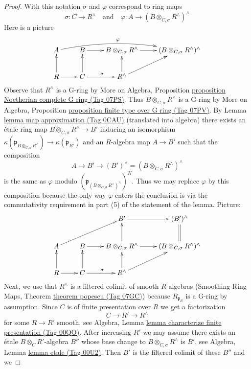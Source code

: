 \documentclass{amsart}
\theoremstyle{plain}
\theoremstyle{definition}
\theoremstyle{remark}
\numberwithin{equation}{subsection}
\begin{document}
\begin{proof}
\medskip\noindent
With this notation $\sigma$ and $\varphi$ correspond to ring maps
$$
\sigma : C \to R^\wedge
\quad\text{and}\quad
\varphi : A \longrightarrow (B \otimes_{C, \sigma} R^\wedge)^\wedge
$$
Here is a picture
$$
\xymatrix{
A \ar@/^1em/[rrr]^\varphi &
B \ar[r] &
B \otimes_{C, \sigma} R^\wedge \ar[r] &
(B \otimes_{C, \sigma} R^\wedge)^\wedge \\
R \ar[r] \ar[u] &
C \ar[r]^\sigma \ar[u] & R^\wedge \ar[u] \ar[ru]
}
$$
Observe that $R^\wedge$ is a G-ring by
More on Algebra, Proposition
\href{https://stacks.math.columbia.edu/tag/07PS}{proposition Noetherian complete G ring (Tag 07PS)}.
Thus $B \otimes_{C, \sigma} R^\wedge$ is a G-ring by
More on Algebra, Proposition
\href{https://stacks.math.columbia.edu/tag/07PV}{proposition finite type over G ring (Tag 07PV)}.
By Lemma \href{https://stacks.math.columbia.edu/tag/0CAU}{lemma map approximation (Tag 0CAU)} (translated into algebra)
there exists an \'etale ring map $B \otimes_{C, \sigma} R^\wedge \to B'$
inducing an isomorphism
$\kappa(\mathfrak p_{B \otimes_{C, \sigma} R^\wedge})
\to \kappa(\mathfrak p_{B'})$
and an $R$-algebra map $A \to B'$ such that the composition
$$
A \to B' \to (B')^\wedge = (B \otimes_{C, \sigma} R^\wedge)^\wedge
$$
is the same as $\varphi$ modulo
$(\mathfrak p_{(B \otimes_{C, \sigma} R^\wedge)^\wedge})^N$.
Thus we may replace $\varphi$ by this composition because the
only way $\varphi$ enters the conclusion is via the commutativity
requirement in part (5) of the statement of the lemma.
Picture:
$$
\xymatrix{
& & B' \ar[r] & (B')^\wedge \ar@{=}[d] \\
A \ar[rru] &
B \ar[r] &
B \otimes_{C, \sigma} R^\wedge \ar[r] \ar[u] &
(B \otimes_{C, \sigma} R^\wedge)^\wedge \\
R \ar[r] \ar[u] &
C \ar[r]^\sigma \ar[u] & R^\wedge \ar[u] \ar[ru]
}
$$
Next, we use that $R^\wedge$ is a filtered colimit of smooth
$R$-algebras (Smoothing Ring Maps, Theorem \href{https://stacks.math.columbia.edu/tag/07GC}{theorem popescu (Tag 07GC)})
because $R_{\mathfrak p_R}$ is a G-ring by assumption. Since $C$ is of
finite presentation over $R$ we get a factorization
$$
C \to R' \to R^\wedge
$$
for some $R \to R'$ smooth, see
Algebra, Lemma \href{https://stacks.math.columbia.edu/tag/00QO}{lemma characterize finite presentation (Tag 00QO)}.
After increasing $R'$ we may assume there exists
an \'etale $B \otimes_C R'$-algebra $B''$ whose base change
to $B \otimes_{C, \sigma} R^\wedge$ is $B'$, see
Algebra, Lemma \href{https://stacks.math.columbia.edu/tag/00U2}{lemma etale (Tag 00U2)}.
Then $B'$ is the filtered colimit of these $B''$ and we

\end{proof}
\end{document}
